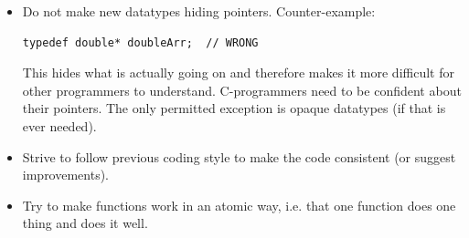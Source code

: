 \documentclass[10pt,a4paper]{article}
\begin{document}
\begin{itemize}
	\item Do not make new datatypes hiding pointers. Counter-example:
	\begin{lstlisting}
typedef double* doubleArr;	// WRONG
	\end{lstlisting}
	This hides what is actually going on and therefore makes it more difficult for other programmers to understand. C-programmers need to be confident about their pointers. The only permitted exception is opaque datatypes (if that is ever needed).
	\item Strive to follow previous coding style to make the code consistent (or suggest improvements).
	\item Try to make functions work in an atomic way, i.e. that one function does one thing and does it well.
\end{itemize}
\end{document}

